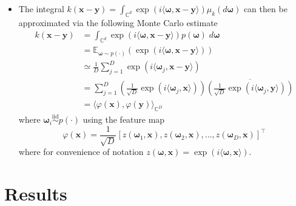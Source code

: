 \documentclass[9pt,hyperref={pdfpagelabels=false},xcolor=table]{beamer}
\begin{document}
\begin{frame}
    \begin{itemize}
        \item The integral $k \left( \bm{x} - \bm{y} \right) = \int_{\mathbb{C}^d} \exp \left( i \langle \bm{\omega} , \bm{x} - \bm{y} \rangle \right) \mu_k \left( d \bm{\omega} \right)$ can then be approximated via the following Monte Carlo estimate
              \begin{align*}
                  k \left( \bm{x} - \bm{y} \right)
                   & = \int_{\mathbb{C}^d} \exp \left( i \langle \bm{\omega} , \bm{x} - \bm{y} \rangle \right) p (\bm{\omega}) \; d \bm{\omega}                                                                                                     \\
                   & = \mathbb{E}_{\bm{\omega} \sim p (\cdot)} \left( \exp \left( i \langle \bm{\omega} , \bm{x} - \bm{y} \rangle \right) \right)                                                                                                   \\
                   & \simeq \frac{1}{D} \sum_{j=1}^{D} \exp \left( i \langle \bm{\omega}_{j} , \bm{x} - \bm{y} \rangle \right)                                                                                                                      \\
                   & = \sum_{j=1}^{D} \left( \frac{1}{\sqrt{D}} \exp \left( i \langle \bm{\omega}_{j} , \bm{x} \rangle \right) \right) \overline{\left( \frac{1}{\sqrt{D}} \exp \left( i \langle \bm{\omega}_{j} , \bm{y} \rangle \right) \right) } \\
                   & = \langle \varphi (\bm{x}) , \varphi (\bm{y}) \rangle_{\mathbb{C}^D}
              \end{align*}
              where $\bm{\omega}_i \stackrel{\text{iid}}{\sim} p(\cdot)$ using the feature map
              \begin{equation*}
                  \varphi (\bm{x}) = \frac{1}{\sqrt{D}} \left[ z \left( \bm{\omega}_1, \bm{x} \right), z \left( \bm{\omega}_2, \bm{x} \right), \ldots , z \left( \bm{\omega}_D, \bm{x} \right) \right]^{\intercal}
              \end{equation*}
              where for convenience of notation $z \left( \bm{\omega}, \bm{x} \right) = \exp \left( i \langle \bm{\omega} , \bm{x} \rangle \right)$.
    \end{itemize}
\end{frame}

\section{Results}
\end{document}
